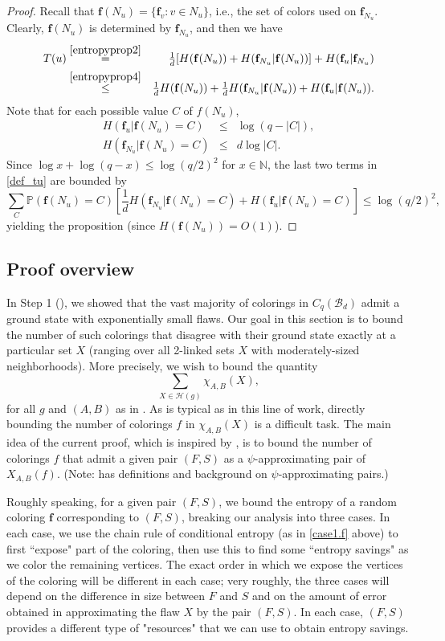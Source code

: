 \documentclass{amsart}
\theoremstyle{definition}
\newcommand{\cB}{\mathcal{B} }
\newcommand{\cH}{\mathcal{H} }
\newcommand{\bbf}{\mathbf{f}}
\newcommand{\beq}[1]{\begin{equation}\label{#1}}
\newcommand{\enq}[0]{\end{equation}}
\newcommand{\0}[0]{\emptyset}
\newcommand{\pr}[0]{\mathbb{P}}
\newcommand{\qq}[0]{(q/2)^2}
\begin{document}
\begin{proof}
Recall that $\bbf(N_u)=\{\bbf_v: v\in N_u\}$, i.e., the set of colors used on $\bbf_{N_u}$.
Clearly, $\bbf(N_u)$ is determined by $\bbf_{N_u}$, and then we have
\begin{eqnarray}
T(u)
&\stackrel{\eqref{entropyprop2}}{=}&\tfrac{1}{d}[H(\bbf(N_u))+H(\bbf_{N_u}|\bbf(N_u))]+H(\bbf_u|\bbf_{N_u})\nonumber\\
&\stackrel{\eqref{entropyprop4}}{\le}&\tfrac{1}{d}H(\bbf(N_u))+\tfrac{1}{d}H(\bbf_{N_u}|\bbf(N_u))+H(\bbf_u|\bbf(N_u)).\label{def_tu}
\end{eqnarray}
Note that for each possible value $C$ of $f(N_u)$,
\begin{eqnarray*}
H(\bbf_u|\bbf(N_u)=C) &\leq & \log(q-|C|),\\
H(\bbf_{N_u}|\bbf(N_u)=C) &\leq & d\log|C|.
\end{eqnarray*}
Since $\log x+\log (q-x)\leq \log \qq$ for $x \in \mathbb N$,
the last two terms in \eqref{def_tu} are bounded by
\[
\sum_C\pr(\bbf(N_u)=C)\left[\frac{1}{d}H(\bbf_{N_u}|\bbf(N_u)=C)+H(\bbf_u|\bbf(N_u)=C)\right]\leq \log \qq,
\]
yielding the proposition (since $H(\bbf(N_u))=O(1)$).
\end{proof}

\subsection{Proof overview} 
In Step 1 (), we showed that the vast majority of colorings in $C_q(\cB_d)$ admit a ground state with exponentially small flaws. Our goal in this section is to bound the number of such colorings that disagree with their ground state exactly at a particular set $X$ (ranging over all 2-linked sets $X$ with moderately-sized neighborhoods). More precisely, we wish to bound the quantity
\beq{quantity}
\sum_{X \in \cH(g)} \chi_{A,B}(X),
\enq
for all $g$ and $(A,B)$ as in .
As is typical as in this line of work, directly bounding the number of colorings $f$ in $\chi_{A,B}(X)$ is a difficult task. The main idea of the current proof, which is inspired by \cite{KPq, misqn}, is to bound the number of colorings $f$ that admit a given pair $(F,S)$ as a $\psi$-approximating pair of $X_{A,B}(f)$. (Note:  has definitions and background on $\psi$-approximating pairs.) 

Roughly speaking, for a given pair $(F,S)$, we bound the entropy of a random coloring $\mathbf{f}$ corresponding to $(F,S)$, breaking our analysis into three cases. In each case, we use the chain rule of conditional entropy (as in \eqref{case1.f} above) to first ``expose" part of the coloring, then use this to find some ``entropy savings" as we color the remaining vertices. The exact order in which we expose the vertices of the coloring will be different in each case; very roughly, the three cases will depend on the difference in size between $F$ and $S$ and on the amount of error obtained in approximating the flaw $X$ by the pair $(F,S)$. In each case, $(F,S)$ provides a different type of "resources" that we can use to obtain entropy savings. 
\end{document}
